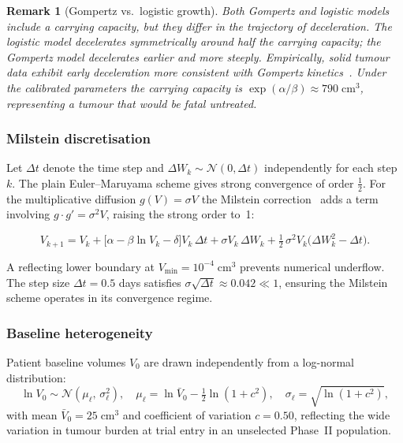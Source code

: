 \documentclass[11pt,a4paper]{article}
\newtheorem{remark}{Remark}
\newcommand{\N}{\mathcal{N}}
\begin{document}
\begin{remark}[Gompertz vs.\ logistic growth]
Both Gompertz and logistic models include a carrying capacity, but they differ
in the trajectory of deceleration. The logistic model decelerates symmetrically
around half the carrying capacity; the Gompertz model decelerates earlier and
more steeply. Empirically, solid tumour data exhibit early deceleration more
consistent with Gompertz kinetics~\cite{Stein2011}. Under the calibrated
parameters the carrying capacity is $\exp(\alpha/\beta) \approx 790\;\text{cm}^3$,
representing a tumour that would be fatal untreated.
\end{remark}
 
\subsubsection{Milstein discretisation}
 
Let $\Delta t$ denote the time step and $\Delta W_k \sim \N(0, \Delta t)$
independently for each step $k$. The plain Euler--Maruyama scheme gives
strong convergence of order $\tfrac{1}{2}$. For the multiplicative diffusion
$g(V) = \sigma V$ the Milstein correction~\cite{Kloeden1992} adds a term
involving $g \cdot g' = \sigma^2 V$, raising the strong order to~1:
 
\begin{equation}
  \label{eq:milstein}
  V_{k+1} = V_k
  + \bigl[\alpha - \beta \ln V_k - \delta\bigr] V_k \,\Delta t
  + \sigma V_k \,\Delta W_k
  + \tfrac{1}{2}\,\sigma^2 V_k \bigl(\Delta W_k^2 - \Delta t\bigr).
\end{equation}
 
A reflecting lower boundary at $V_{\min} = 10^{-4}\;\text{cm}^3$ prevents
numerical underflow. The step size $\Delta t = 0.5$ days satisfies
$\sigma\sqrt{\Delta t} \approx 0.042 \ll 1$, ensuring the Milstein scheme
operates in its convergence regime.
 
\subsubsection{Baseline heterogeneity}
 
Patient baseline volumes $V_0$ are drawn independently from a log-normal
distribution:
\begin{equation}
  \ln V_0 \sim \N\!\left(\mu_\ell,\, \sigma_\ell^2\right),
  \quad
  \mu_\ell = \ln \bar{V}_0 - \tfrac{1}{2}\ln(1 + c^2),
  \quad
  \sigma_\ell = \sqrt{\ln(1+c^2)},
\end{equation}
with mean $\bar{V}_0 = 25\;\text{cm}^3$ and coefficient of variation $c = 0.50$,
reflecting the wide variation in tumour burden at trial entry in an unselected
Phase~II population.
 
\end{document}
